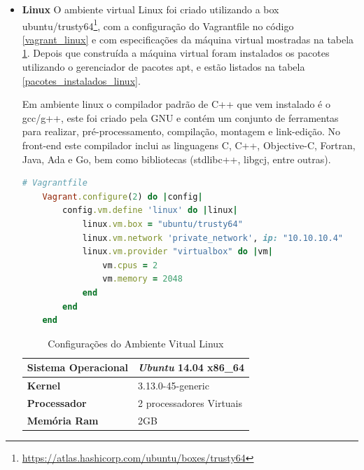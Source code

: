 \begin{itemize}

    \item \textbf{Linux}
        \subitem  O ambiente virtual Linux foi criado utilizando a box
 ubuntu/trusty64\footnote{\url{https://atlas.hashicorp.com/ubuntu/boxes/trusty64}},
 com a configuração do Vagrantfile no código \ref{vagrant_linux} e com especificações
 da máquina virtual mostradas na tabela \ref{especificacoes_linux}.
 Depois que construída a máquina virtual foram instalados os pacotes utilizando o
 gerenciador de pacotes apt, e estão listados na tabela \ref{pacotes_instalados_linux}.

Em ambiente linux o compilador padrão de C++ que vem instalado é o gcc/g++, este foi
 criado pela GNU e contém um conjunto de ferramentas para realizar, pré-processamento,
 compilação, montagem e link-edição. No front-end este compilador inclui as linguagens C,
 C++, Objective-C, Fortran, Java, Ada e Go, bem como bibliotecas
 (stdlibc++, libgcj, entre outras).


\begin{lstlisting}[language=ruby, caption={Vagrantfile com configurações da máquina virtual linux},
                  label=vagrant_linux]
    # Vagrantfile
    Vagrant.configure(2) do |config|
        config.vm.define 'linux' do |linux|
            linux.vm.box = "ubuntu/trusty64"
            linux.vm.network 'private_network', ip: "10.10.10.4"
            linux.vm.provider "virtualbox" do |vm| 
                vm.cpus = 2
                vm.memory = 2048
            end
        end              
    end
\end{lstlisting}

\begin{table}[h]
\centering
\begin{tabular}{ll}
\textbf{Sistema Operacional} & \textit{Ubuntu} 14.04 x86\_64 \\ \toprule
\textbf{Kernel} & 3.13.0-45-generic  \\ \midrule 
\textbf{Processador} & 2 processadores Virtuais \\ \midrule
\textbf{Memória Ram} & 2GB  \\ \bottomrule 
\end{tabular} 
\caption{Configurações do Ambiente Vitual Linux}
\label{especificacoes_linux}
\end{table}


\end{itemize}
